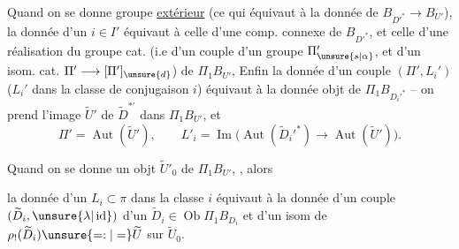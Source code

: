 Quand on se donne   groupe \uline{extérieur}  (ce qui  équivaut à la donnée de \(B_{D'^*}\longrightarrow B_{U'}\)), la donnée d'un  \(i\in I'\) équivaut à celle d'une comp. connexe de \(B_{D'^*}\), et celle d'une réalisation  du groupe cat. (i.e d'un couple d'un groupe \(\Pi'_{\unsure{s|\alpha}}\), et d'un isom. cat. \(\Pi'\longrightarrow[\Pi']_{\unsure{d}}\))   de \(\Pi_1B_{U'}\), Enfin la donnée d'un couple \((\Pi',L_i')\) (\(L_i'\) dans la classe de conjugaison \(i\)) équivaut  à la donnée  objt  de \(\Pi_1B_{D_i'^*}\) -- on prend l'image \(\widetilde U'\) de \(\widetilde D^{*'}\) dans \(\Pi_1B_{U'}\), et
\[
\Pi'=\operatorname{Aut}(\widetilde U'),\qquad
L'_i=\operatorname{Im}\bigl(\operatorname{Aut}(\widetilde D_i'^*)\longrightarrow
\operatorname{Aut}(\widetilde U')\bigr).
\]

Quand on se donne   un objt \(\widetilde U'_0\) de \(\Pi_1B_{U'}\),  , alors


la donnée d'un \(L_i\subset\pi\) dans la classe \(i\) équivaut à la donnée d'un couple \((\widetilde D_i,\unsure{\lambda|\operatorname{id}})\) d'un \(\widetilde D_i\in\operatorname{Ob}\Pi_1B_{D_i}\) et d'un isom de \(\rho_!(\widetilde D_i)\unsure{=:|=}\widetilde U\) sur \(\widetilde U_0\).

